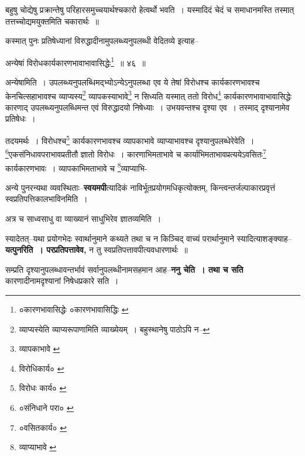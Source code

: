 \documentclass[article,12pt,a4paper]{memoir}
\begin{document}
	  \pstart बहुषु चोद्येषु प्रक्रान्तेषु परिहारसमुच्चयार्थश्चकारो हेत्वर्थो भवति । यस्मादिदं चेदं च समाधानमस्ति तस्मात् तत्तच्चोद्यमयुक्तमिति चकारार्थः ॥
	\pend
       

	  \pstart कस्मात् पुनः प्रतिषेध्यानां विरुद्धादीनामुपलब्ध्यनुपलब्धी वेदितव्ये इत्याह--
	\pend
       
	  \bigskip
	  \begingroup
	

	  \pstart अन्येषां विरोधकार्यकारणभावाभावासिद्धेः\footnote{०कारणभावासिद्धेः \cite{dp-edE} ०कारणभावासिद्धिः \cite{dp-msB} \cite{dp-edP} \cite{dp-edH}} ॥ ४६ ॥
	\pend
      
	  \endgroup
	 

	  \pstart अन्येषामिति । उपलब्ध्यनुपलब्धिमद्भ्योऽन्येऽनुपलब्धा एव ये तेषां विरोधश्च कार्यकारणभावश्च केनचित्सहाभावश्च व्याप्यस्य\footnote{व्याप्यस्येति व्याप्यरूपाणामिति व्याख्येयम् । बहुस्थानेषु पाठोऽपि न--\cite{dp-msD-n}} व्यापकस्याभावे\footnote{व्यापकाभावे \cite{dp-msC}} न सिध्यति यस्मात् ततो विरोध\footnote{विरोधिकार्य० \cite{dp-msA} \cite{dp-msB} \cite{dp-edP} \cite{dp-edE} \cite{dp-edH} \cite{dp-edN}} कार्यकारणभावाभावासिद्धेः कारणाद् उपलब्ध्यनुपलब्धिमन्त एवं विरुद्धादयो निषेध्याः । उभयवन्तश्च दृश्या एव । तस्माद् दृश्यानामेव प्रतिषेधः ।
	\pend
       

	  \pstart तदयमर्थः । विरोधश्च\footnote{विरोधः कार्य० \cite{dp-msA} \cite{dp-edP} \cite{dp-edH} \cite{dp-edE}} कार्यकारणभावश्च व्यापकाभावे व्याप्याभावश्च दृश्यानुपलब्धेरेवेति । \footnote{०संनिधाने परा० \cite{dp-msC}}\-एकसंनिधावपराभावप्रतीतौ ज्ञातो विरोधः । कारणाभिमताभावे च कार्याभिमताभावप्रत्ययेऽवसितः\footnote{०वसितकार्य० \cite{dp-edP} \cite{dp-edH} \cite{dp-msA} \cite{dp-msB}} कार्यकारणभावः । व्यापकाभिमताभावे च \footnote{व्याप्याभावे \cite{dp-msA} \cite{dp-msB} \cite{dp-msD} \cite{dp-edP} \cite{dp-edH} \cite{dp-edE} \cite{dp-edN}}\-व्याप्याभि-
	\pend
      
	  \endgroup
	

	  \pstart अन्ये पुनरन्यथा व्यवस्थिताः--\textbf{स्वयमपी}त्यादिकं नाविर्भूतप्रयोगमधिकृत्योक्तम्, किन्त्वन्तर्जल्पाकारप्रवृत्तं स्वप्रतिपत्तिकालभा\leavevmode{}विनमिति ।
	\pend
      

	  \pstart अत्र च साध्वसाधु वा व्याख्यानं साधुभिरेव ज्ञातव्यमिति ।
	\pend
      

	  \pstart स्यादेतत्--यथा प्रयोगभेदः स्वार्थानुमाने कथ्यते तथा च न किञ्चिद् वाच्यं परार्थानुमाने स्यादित्याशङ्क्याह--\textbf{यत्पुनरिति । परप्रतिपत्तावेव,} न तु स्वप्रतिपत्तावपीत्यवधारणार्थः ॥
	\pend
      

	  \pstart सम्प्रति दृश्यानुपलब्धावन्तर्भावं सर्वानुपलब्धीनामसहमान आह--\textbf{ननु चेति । तथा च सति} कारणादीनामदृश्यानां निषेधप्रकारे सति ।
	\pend
      
\end{document}
